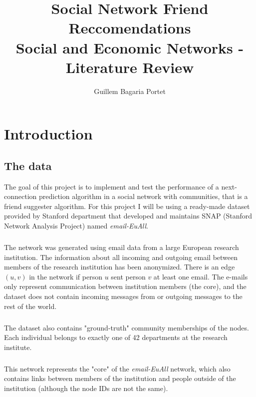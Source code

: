 \documentclass[12pt,a4paper]{report}
\title{Social Network Friend Reccomendations \\
	\large Social and Economic Networks - Literature Review \\}
\author{Guillem Bagaria Portet}
\begin{document}
\doublespacing

\maketitle

\tableofcontents

\singlespacing

\newpage

\chapter{Introduction}

\section{The data} The goal of this project is to implement and test the performance of a next-connection prediction algorithm in a social network with communities, that is a friend suggester algorithm. For this project I will be using a ready-made dataset provided by Stanford department that developed and maintains SNAP (Stanford Network Analysis Project) named \emph{email-EuAll}.

\paragraph{} The network was generated using email data from a large European research institution. The information about all incoming and outgoing email between members of the research institution has been anonymized. There is an edge $(u, v)$ in the network if person $u$ sent person $v$ at least one email. The e-mails only represent communication between institution members (the core), and the dataset does not contain incoming messages from or outgoing messages to the rest of the world.

\paragraph{} The dataset also contains "ground-truth" community memberships of the nodes. Each individual belongs to exactly one of 42 departments at the research institute.

\paragraph{} This network represents the "core" of the \emph{email-EuAll} network, which also contains links between members of the institution and people outside of the institution (although the node IDs are not the same). 
\end{document}
